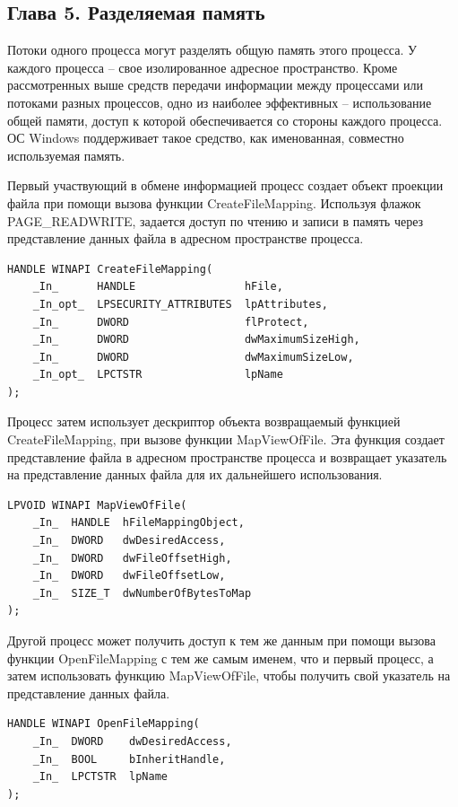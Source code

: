 \documentclass[14pt,a4paper,report]{report}
\begin{document}
\subsection{Глава 5. Разделяемая память}

Потоки одного процесса могут разделять общую память этого процесса. У каждого процесса – свое изолированное адресное пространство. Кроме рассмотренных выше средств передачи информации между процессами или потоками разных процессов, одно из наиболее эффективных – использование общей памяти, доступ к которой обеспечивается со стороны каждого процесса. ОС Windows поддерживает такое средство, как именованная, совместно используемая память. 

Первый участвующий в обмене информацией процесс создает объект проекции файла при помощи вызова функции CreateFileMapping. Используя флажок PAGE\_READWRITE, задается доступ по чтению и записи в память через представление данных файла в адресном пространстве процесса.

\begin{verbatim}
HANDLE WINAPI CreateFileMapping(
    _In_      HANDLE                 hFile,
    _In_opt_  LPSECURITY_ATTRIBUTES  lpAttributes,
    _In_      DWORD                  flProtect,
    _In_      DWORD                  dwMaximumSizeHigh,
    _In_      DWORD                  dwMaximumSizeLow,
    _In_opt_  LPCTSTR                lpName
);
\end{verbatim}

Процесс затем использует дескриптор объекта возвращаемый функцией CreateFileMapping, при вызове функции MapViewOfFile. Эта функция создает представление файла в адресном пространстве процесса и возвращает указатель на представление данных файла для их дальнейшего использования.

\begin{verbatim}
LPVOID WINAPI MapViewOfFile(
    _In_  HANDLE  hFileMappingObject,
    _In_  DWORD   dwDesiredAccess,
    _In_  DWORD   dwFileOffsetHigh,
    _In_  DWORD   dwFileOffsetLow,
    _In_  SIZE_T  dwNumberOfBytesToMap
);
\end{verbatim}

Другой процесс может получить доступ к тем же данным при помощи вызова функции OpenFileMapping с тем же самым именем, что и первый процесс, а затем использовать функцию MapViewOfFile, чтобы получить свой указатель на представление данных файла.

\begin{verbatim}
HANDLE WINAPI OpenFileMapping(
    _In_  DWORD    dwDesiredAccess,
    _In_  BOOL     bInheritHandle,
    _In_  LPCTSTR  lpName
);
\end{verbatim}
\end{document}
